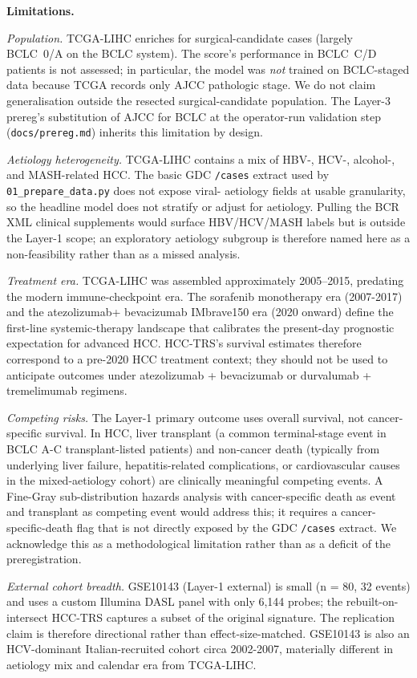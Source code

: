 \documentclass[12pt]{article}
\newcommand{\HCCRTS}{HCC-TRS\xspace}
\begin{document}
\textbf{Limitations.}

\emph{Population.} TCGA-LIHC enriches for surgical-candidate cases
(largely BCLC~0/A on the BCLC system). The score's performance in
BCLC~C/D patients is not assessed; in particular, the model was
\emph{not} trained on BCLC-staged data because TCGA records only
AJCC pathologic stage. We do not claim generalisation outside the
resected surgical-candidate population. The Layer-3 prereg's
substitution of AJCC for BCLC at the operator-run validation step
(\texttt{docs/prereg.md}) inherits this limitation by design.

\emph{Aetiology heterogeneity.} TCGA-LIHC contains a mix of HBV-,
HCV-, alcohol-, and MASH-related HCC. The basic GDC \texttt{/cases}
extract used by \texttt{01\_prepare\_data.py} does not expose viral-
aetiology fields at usable granularity, so the headline model does
not stratify or adjust for aetiology. Pulling the BCR XML clinical
supplements would surface HBV/HCV/MASH labels but is outside the
Layer-1 scope; an exploratory aetiology subgroup is therefore named
here as a non-feasibility rather than as a missed analysis.

\emph{Treatment era.} TCGA-LIHC was assembled approximately
2005--2015, predating the modern immune-checkpoint era. The
sorafenib monotherapy era (2007-2017) and the atezolizumab+
bevacizumab IMbrave150 era (2020 onward) define the first-line
systemic-therapy landscape that calibrates the present-day prognostic
expectation for advanced HCC.\citep{vogel2022hepatocellular}
\HCCRTS's survival estimates therefore correspond to a pre-2020 HCC
treatment context; they should not be used to anticipate outcomes
under atezolizumab + bevacizumab or durvalumab + tremelimumab regimens.

\emph{Competing risks.} The Layer-1 primary outcome uses overall
survival, not cancer-specific survival. In HCC, liver transplant (a
common terminal-stage event in BCLC A-C transplant-listed patients)
and non-cancer death (typically from underlying liver failure,
hepatitis-related complications, or cardiovascular causes in the
mixed-aetiology cohort) are clinically meaningful competing events.
A Fine-Gray sub-distribution hazards analysis with cancer-specific
death as event and transplant as competing event would address this;
it requires a cancer-specific-death flag that is not directly
exposed by the GDC \texttt{/cases} extract. We acknowledge this as a
methodological limitation rather than as a deficit of the
preregistration.

\emph{External cohort breadth.} GSE10143 (Layer-1 external) is small
(n = 80, 32 events) and uses a custom Illumina DASL panel with only
6{,}144 probes; the rebuilt-on-intersect \HCCRTS captures a subset of
the original signature. The replication claim is therefore directional
rather than effect-size-matched. GSE10143 is also an HCV-dominant
Italian-recruited cohort circa 2002-2007, materially different in
aetiology mix and calendar era from TCGA-LIHC.
\end{document}

